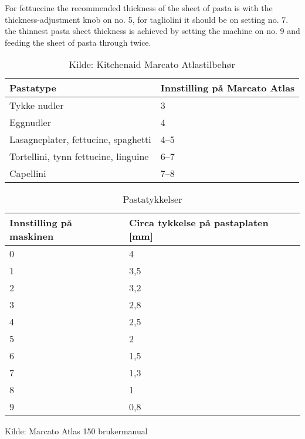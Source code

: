 For fettuccine the recommended thickness of the sheet of pasta is with the  thickness-adjustment knob on no. 5, for tagliolini it should
be on setting no. 7.
the thinnest pasta sheet thickness is achieved by setting the machine
on no. 9 and feeding the sheet of pasta through twice.\\


\begin{table}[]
\centering
\begin{tabular}{ll}
\toprule
Pastatype                            & Innstilling på Marcato Atlas \\ \midrule
Tykke nudler                         & 3                            \\
Eggnudler                            & 4                            \\
Lasagneplater, fettucine, spaghetti  & 4--5                         \\
Tortellini, tynn fettucine, linguine & 6--7                         \\
Capellini                            & 7--8                         \\ \bottomrule
\end{tabular}
\caption{Kilde: Kitchenaid Marcato Atlastilbehør}
\label{pastatyper}
\end{table}


\begin{table}[]
\centering
\begin{tabular}{ll}
\toprule
Innstilling på maskinen & Circa tykkelse på pastaplaten [mm] \\ \midrule
0                       & 4                                              \\
1                       & 3,5                                            \\
2                       & 3,2                                            \\
3                       & 2,8                                            \\
4                       & 2,5                                            \\
5                       & 2                                              \\
6                       & 1,5                                            \\
7                       & 1,3                                            \\
8                       & 1                                              \\
9                       & 0,8                                            \\ \bottomrule
\end{tabular}
\caption{Pastatykkelser}
\label{pastatykkelser}
\end{table}

Kilde: Marcato Atlas 150 brukermanual

